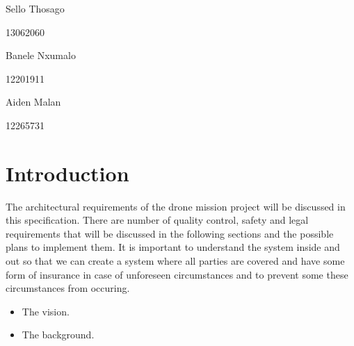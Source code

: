 \documentclass{article}
\begin{document}
\begin{titlepage}
\begin{center}
			\begin{minipage}{0.4\textwidth}
				\begin{flushleft} \large
					Sello {Thosago}
				\end{flushleft}
			\end{minipage}
			\begin{minipage}{0.4\textwidth}
				\begin{flushright} \large
					\emph{}
					13062060
				\end{flushright}
			\end{minipage}
			
			\begin{minipage}{0.4\textwidth}
				\begin{flushleft} \large
					Banele {Nxumalo}
				\end{flushleft}
			\end{minipage}
			\begin{minipage}{0.4\textwidth}
				\begin{flushright} \large
					\emph{}
					12201911
				\end{flushright}
			\end{minipage}
			
			\begin{minipage}{0.4\textwidth}
				\begin{flushleft} \large
					Aiden {Malan}
				\end{flushleft}
			\end{minipage}
			\begin{minipage}{0.4\textwidth}
				\begin{flushright} \large
					\emph{}
					12265731
				\end{flushright}
			\end{minipage}
			
			
			\vfill
			
		\end{center}
	\end{titlepage}
	\footnotesize
	\normalsize
	
	
	\tableofcontents
	\newpage
	
	\newpage %
	\section{Introduction} 
	The architectural requirements of the drone mission project will be discussed in this specification. There are number of quality control, safety and legal requirements that will be discussed in the following sections and the possible plans to implement them. It is important to understand the system inside and out so that we can create a system where all parties are covered and have some form of insurance in case of unforeseen circumstances and to prevent some these circumstances from occuring.
	\begin{itemize} 
		\item The vision.
		\item The background.
	\end{itemize}
	
\end{document}
